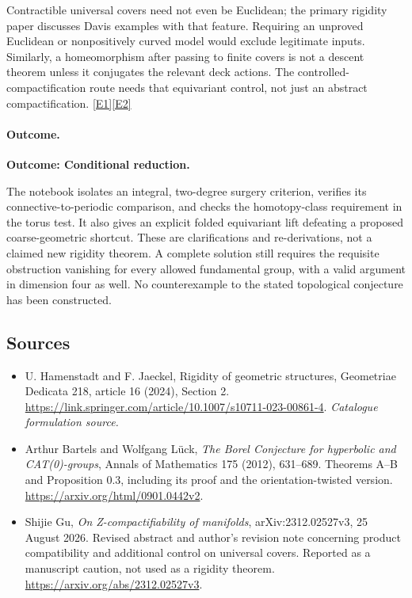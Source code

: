 \documentclass[11pt,a4paper]{article}
\newcommand{\eref}[2]{\hyperlink{extra:#1:#2}{[E#2]}}
\numberwithin{equation}{section}
\begin{document}
Contractible universal covers need not even be Euclidean; the primary
rigidity paper discusses Davis examples with that feature. Requiring an
unproved Euclidean or nonpositively curved model would exclude legitimate
inputs. Similarly, a homeomorphism after passing to finite covers is not
a descent theorem unless it conjugates the relevant deck actions.
The controlled-compactification route needs that equivariant control,
not just an abstract compactification. \eref{statement}{1}\eref{statement}{2}

\paragraph{Outcome.}
\textbf{Outcome: Conditional reduction.}

The notebook isolates an integral, two-degree surgery criterion, verifies
its connective-to-periodic comparison, and checks the homotopy-class
requirement in the torus test. It also gives an explicit folded equivariant
lift defeating a proposed coarse-geometric shortcut. These are
clarifications and re-derivations, not a claimed new rigidity theorem.
A complete solution still requires the requisite obstruction vanishing
for every allowed fundamental group, with a valid argument in dimension
four as well. No counterexample to the stated topological conjecture has
been constructed.

\subsection{Sources}
\begin{itemize}\raggedright
\item[\textnormal{[S1]}]\hypertarget{source:statement:1}{} U. Hamenstadt and F. Jaeckel, Rigidity of geometric structures, Geometriae Dedicata 218, article 16 (2024), Section 2.
\url{https://link.springer.com/article/10.1007/s10711-023-00861-4}.
{\small\textit{Catalogue formulation source.}}
\item[\textnormal{[E1]}]\hypertarget{extra:statement:1}{} Arthur Bartels and Wolfgang L\"uck,
\emph{The Borel Conjecture for hyperbolic and CAT(0)-groups},
Annals of Mathematics 175 (2012), 631--689. Theorems A--B and
Proposition 0.3, including its proof and the orientation-twisted version.
\url{https://arxiv.org/html/0901.0442v2}.
\item[\textnormal{[E2]}]\hypertarget{extra:statement:2}{} Shijie Gu,
\emph{On Z-compactifiability of manifolds}, arXiv:2312.02527v3,
25 August 2026. Revised abstract and author's revision note concerning
product compatibility and additional control on universal covers.
Reported as a manuscript caution, not used as a rigidity theorem.
\url{https://arxiv.org/abs/2312.02527v3}.
\end{itemize}
\end{document}

